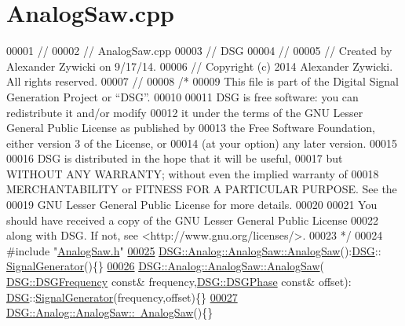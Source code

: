 \hypertarget{_analog_saw_8cpp_source}{\section{Analog\+Saw.\+cpp}
\label{_analog_saw_8cpp_source}
}

\begin{DoxyCode}
00001 \textcolor{comment}{//}
00002 \textcolor{comment}{//  AnalogSaw.cpp}
00003 \textcolor{comment}{//  DSG}
00004 \textcolor{comment}{//}
00005 \textcolor{comment}{//  Created by Alexander Zywicki on 9/17/14.}
00006 \textcolor{comment}{//  Copyright (c) 2014 Alexander Zywicki. All rights reserved.}
00007 \textcolor{comment}{//}
00008 \textcolor{comment}{/*}
00009 \textcolor{comment}{ This file is part of the Digital Signal Generation Project or “DSG”.}
00010 \textcolor{comment}{}
00011 \textcolor{comment}{ DSG is free software: you can redistribute it and/or modify}
00012 \textcolor{comment}{ it under the terms of the GNU Lesser General Public License as published by}
00013 \textcolor{comment}{ the Free Software Foundation, either version 3 of the License, or}
00014 \textcolor{comment}{ (at your option) any later version.}
00015 \textcolor{comment}{}
00016 \textcolor{comment}{ DSG is distributed in the hope that it will be useful,}
00017 \textcolor{comment}{ but WITHOUT ANY WARRANTY; without even the implied warranty of}
00018 \textcolor{comment}{ MERCHANTABILITY or FITNESS FOR A PARTICULAR PURPOSE.  See the}
00019 \textcolor{comment}{ GNU Lesser General Public License for more details.}
00020 \textcolor{comment}{}
00021 \textcolor{comment}{ You should have received a copy of the GNU Lesser General Public License}
00022 \textcolor{comment}{ along with DSG.  If not, see <http://www.gnu.org/licenses/>.}
00023 \textcolor{comment}{ */}
00024 \textcolor{preprocessor}{#include "\hyperlink{_analog_saw_8h}{AnalogSaw.h}"}
\hypertarget{_analog_saw_8cpp_source_l00025}{}\hyperlink{class_d_s_g_1_1_analog_1_1_analog_saw_abcb0b997be32413da0d14b93aeeb9c17}{00025} \hyperlink{class_d_s_g_1_1_analog_1_1_analog_saw_abcb0b997be32413da0d14b93aeeb9c17}{DSG::Analog::AnalogSaw::AnalogSaw}():\hyperlink{namespace_d_s_g}{DSG}::
      \hyperlink{class_d_s_g_1_1_signal_generator}{SignalGenerator}()\{\}
\hypertarget{_analog_saw_8cpp_source_l00026}{}\hyperlink{class_d_s_g_1_1_analog_1_1_analog_saw_ad110da0b337948fb70ecdfad7dbb5ddf}{00026} \hyperlink{class_d_s_g_1_1_analog_1_1_analog_saw_abcb0b997be32413da0d14b93aeeb9c17}{DSG::Analog::AnalogSaw::AnalogSaw}(
      \hyperlink{namespace_d_s_g_a4315a061386fa1014fda09b15d3a6973}{DSG::DSGFrequency} \textcolor{keyword}{const}& frequency,\hyperlink{namespace_d_s_g_a44431ce1eb0a7300efdd207bc879e52c}{DSG::DSGPhase} \textcolor{keyword}{const}& offset):
      \hyperlink{namespace_d_s_g}{DSG}::\hyperlink{class_d_s_g_1_1_signal_generator}{SignalGenerator}(frequency,offset)\{\}
\hypertarget{_analog_saw_8cpp_source_l00027}{}\hyperlink{class_d_s_g_1_1_analog_1_1_analog_saw_a42a5fe22e0c3b9d1bd3996fe5bbd24ba}{00027} \hyperlink{class_d_s_g_1_1_analog_1_1_analog_saw_a42a5fe22e0c3b9d1bd3996fe5bbd24ba}{DSG::Analog::AnalogSaw::~AnalogSaw}()\{\}
\end{DoxyCode}
